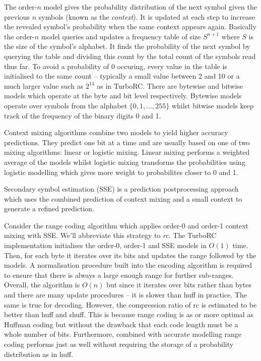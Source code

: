 The order-$n$ model gives the probability distribution of the next symbol given
the previous $n$ symbols (known as the \textit{context}). It is updated at each
step to increase the revealed symbol's probability when the same context appears
again.
Basically the order-$n$ model queries and updates a frequency table of
size $S^{n+1}$ where $S$ is the size of the symbol's alphabet.
It finds the probability of the next symbol by querying the table and
dividing this count by the total count of the symbols read thus far. To avoid a
probability of 0 occuring, every value in the table is initialised to the
same count -- typically a small value between 2 and 10 or a much larger
value such as $2^{14}$ as in TurboRC.
There are bytewise and bitwise models which operate at the byte and bit level
respectively. Bytewise models operate over symbols from the alphabet
$\{0,1,\dots,255\}$ whilst bitwise models keep track of the frequency of
the binary digits 0 and 1.

Context mixing algorithms combine two models to yield higher accuracy
predictions. They predict one bit at a time and are usually based on one of
two mixing algorithms: linear or logistic mixing. Linear mixing performs
a weighted average of the models whilst logistic mixing transforms the
probabilities using logistic modelling which gives more weight to
probabilites closer to 0 and 1.

Secondary symbol estimation (SSE) is a prediction postprocessing approach which
uses the combined prediction of context mixing and a small context to generate a
refined prediction.

Consider the range coding algorithm which applies order-0 and order-1
context mixing with SSE. We'll abbreviate this strategy to \textit{rc}. The
TurboRC implementation initialises the order-0, order-1 and SSE models in $O(1)$
time. Then, for each byte it iterates over its bits and updates the range
followed by the models. A normalisation procedure built into the encoding
algorithm is required to ensure that there is always a large enough range for
further sub-ranges. Overall, the algorithm is $O(n)$ but since it iterates over
bits rather than bytes and there are many update procedures -- it is slower than
huff in practice. The same is true for decoding. However, the compression ratio
of rc is estimated to be better than huff and shuff. This is because range
coding is as or more optimal as Huffman coding but without the drawback that
each code length must be a whole number of bits. Furthermore, combined with
accurate modelling range coding performs just as well without requiring the
storage of a probability distribution as in huff.

